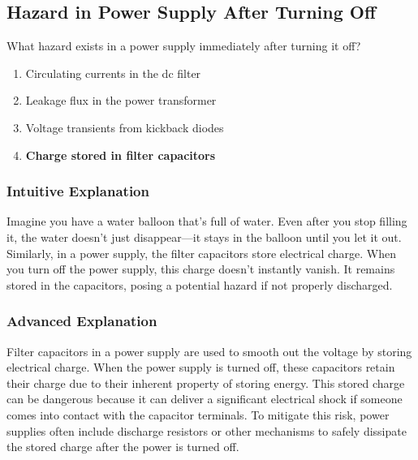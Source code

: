 \subsection{Hazard in Power Supply After Turning Off}
\label{T0A11}

\begin{tcolorbox}[colback=gray!10!white,colframe=black!75!black,title=T0A11]
What hazard exists in a power supply immediately after turning it off?
\begin{enumerate}[noitemsep]
    \item Circulating currents in the dc filter
    \item Leakage flux in the power transformer
    \item Voltage transients from kickback diodes
    \item \textbf{Charge stored in filter capacitors}
\end{enumerate}
\end{tcolorbox}

\subsubsection*{Intuitive Explanation}
Imagine you have a water balloon that's full of water. Even after you stop filling it, the water doesn't just disappear—it stays in the balloon until you let it out. Similarly, in a power supply, the filter capacitors store electrical charge. When you turn off the power supply, this charge doesn't instantly vanish. It remains stored in the capacitors, posing a potential hazard if not properly discharged.

\subsubsection*{Advanced Explanation}
Filter capacitors in a power supply are used to smooth out the voltage by storing electrical charge. When the power supply is turned off, these capacitors retain their charge due to their inherent property of storing energy. This stored charge can be dangerous because it can deliver a significant electrical shock if someone comes into contact with the capacitor terminals. To mitigate this risk, power supplies often include discharge resistors or other mechanisms to safely dissipate the stored charge after the power is turned off.